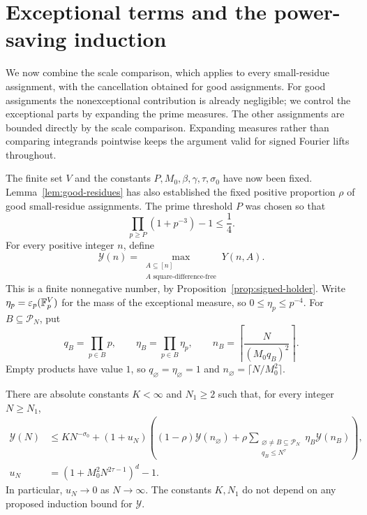 \section{Exceptional terms and the power-saving induction}
\label{sec:induction}

We now combine the scale comparison, which applies to every small-residue
assignment, with the cancellation obtained for good assignments. For good
assignments the nonexceptional contribution is already negligible; we control
the exceptional parts by expanding the prime measures. The other assignments
are bounded directly by the scale comparison. Expanding measures rather than
comparing integrands pointwise keeps the argument valid for signed Fourier
lifts throughout.

The finite set $V$ and the constants $P,M_0,\beta,\gamma,\tau,\sigma_0$
have now been fixed. Lemma~\ref{lem:good-residues} has also established the
fixed positive proportion $\rho$ of good small-residue assignments.
The prime threshold $P$ was chosen so that
\begin{equation}
 \prod_{p\ge P}(1+p^{-3})-1\le\frac14.
 \label{eq:exceptional-euler-budget}
\end{equation}
For every positive integer $n$, define
\begin{equation}
 \mathcal Y(n)=
 \max_{\substack{A\subseteq[n]\\ A\text{ square-difference-free}}}Y(n,A).
 \label{eq:maximal-functional}
\end{equation}
This is a finite nonnegative number, by Proposition~\ref{prop:signed-holder}.
Write $\eta_p=\varepsilon_p(\mathbb F_p^V)$ for the mass of the exceptional measure,
so $0\le \eta_p\le p^{-4}$.  For
$B\subseteq\mathcal P_N$, put
\begin{equation}
 q_B=\prod_{p\in B}p,\qquad
 \eta_B=\prod_{p\in B}\eta_p,\qquad
 n_B=\left\lceil\frac{N}{(M_0q_B)^2}\right\rceil.
 \label{eq:exceptional-subset-notation}
\end{equation}
Empty products have value $1$, so $q_\varnothing=\eta_\varnothing=1$ and
$n_\varnothing=\lceil N/M_0^2\rceil$.

\begin{proposition}\label{prop:induction-recurrence}
There are absolute constants $K<\infty$ and $N_1\ge2$ such that, for every
integer $N\ge N_1$,
\begin{align}
 \mathcal Y(N)
 &\le K N^{-\sigma_0}
 +(1+u_N)\left((1-\rho)\mathcal Y(n_\varnothing)
       +\rho\!
       \sum_{\substack{\varnothing\ne B\subseteq\mathcal P_N\\q_B\le N^\tau}}
            \eta_B\mathcal Y(n_B)\right),
 \label{eq:functional-recurrence}\\
 u_N&=(1+M_0^2N^{2\tau-1})^d-1.
 \label{eq:uniform-ceiling-error}
\end{align}
In particular, $u_N\to0$ as $N\to\infty$.  The constants $K,N_1$ do not
depend on any proposed induction bound for $\mathcal Y$.
\end{proposition}

